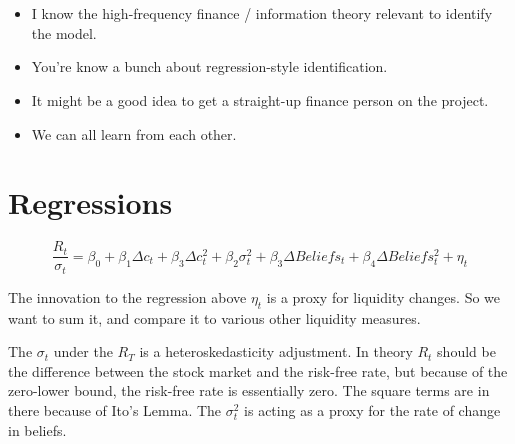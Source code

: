 \documentclass[11pt]{article}
\begin{document}
\section{}

\begin{itemize}
    \item I know the high-frequency finance / information theory relevant to identify the model.
    \item You're know a bunch about regression-style identification.
    \item It might be a good idea to get a straight-up finance person on the project.
    \item We can all learn from each other.
\end{itemize}




\section{Regressions}


\begin{equation}
    \frac{R_t}{\sigma_t} = \beta_0 + \beta_1 \Delta c_t + \beta_3 \Delta c_t^2 + \beta_2 \sigma^2_t + \beta_3
    \Delta Beliefs_t  + \beta_4 \Delta Beliefs^2_t + \eta_t
\end{equation}

The innovation to the regression above $\eta_t$ is a proxy for liquidity changes.
So we want to sum it, and compare it to various other liquidity measures.

The $\sigma_t$ under the $R_T$ is a heteroskedasticity adjustment.
In theory $R_t$ should be the difference between the stock market and the risk-free rate, but because of the
zero-lower bound, the risk-free rate is essentially zero. 
The square terms are in there because of Ito's Lemma. 
The $\sigma_t^2$ is acting as a proxy for the rate of change in beliefs.
\end{document}
